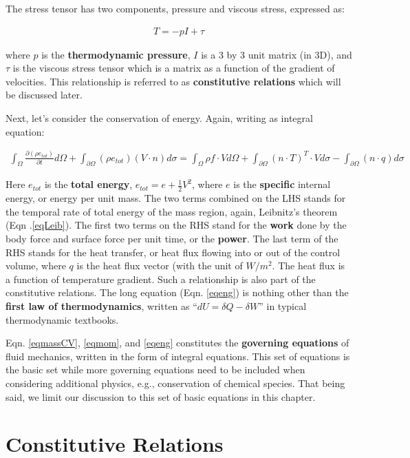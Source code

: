 \documentclass[12pt, letterpaper]{report}
\begin{document}
The stress tensor has two components, pressure and viscous stress, expressed as:

\begin{align*}
   T = -p I + \tau
\end{align*}

where $p$ is the {\bf thermodynamic pressure}, $I$ is a 3 by 3 unit matrix (in 3D), and $\tau$ is the
viscous stress tensor which is a matrix as a function of the gradient of velocities. This
relationship is referred to as {\bf constitutive relations} which will be discussed later.
\paraspace

Next, let's consider the conservation of energy. Again, writing as integral equation:

\begin{align}\label{eqeng}
   \int_\Omega\frac{\partial(\rho e_{tot})}{\partial t} d\Omega + \int_{\partial\Omega}(\rho
   e_{tot}) (V \cdot n) d\sigma = \int_\Omega \rho f \cdot V d\Omega + \int_{\partial\Omega} (n\cdot
   T)^T \cdot V d\sigma - \int_{\partial\Omega}(n \cdot q) d\sigma
\end{align}

Here $e_{tot}$ is the {\bf total energy}, $e_{tot} = e + \tfrac{1}{2}V^2$, where $e$ is the
{\bf specific} internal energy, or energy per unit mass. The two terms combined on the LHS stands
for the temporal rate of total energy of the mass region, again, Leibnitz's theorem (Eqn
.\ref{eqLeib}). The first two terms on the RHS stand for the {\bf work} done by the body force and
surface force per unit time, or the {\bf power}. The last term of the RHS stands for the heat
transfer, or heat flux flowing into or out of the control volume, where $q$ is the heat flux vector
(with the unit of $W/m^2$. The heat flux is a function of temperature gradient. Such a relationship
is also part of the constitutive relations. The long equation (Eqn. \ref{eqeng}) is nothing other
than the {\bf first law of thermodynamics}, written as ``$dU = \delta Q - \delta W$'' in typical
thermodynamic textbooks.
\paraspace

Eqn. \ref{eqmassCV}, \ref{eqmom}, and \ref{eqeng} constitutes the {\bf governing equations} of
fluid mechanics, written in the form of integral equations. This set of equations is the basic set
while more governing equations need to be included when considering additional physics, e.g.,
conservation of chemical species. That being said, we limit our discussion to this set of basic
equations in this chapter.
\paraspace

\clearpage
\section{Constitutive Relations}
\end{document}
